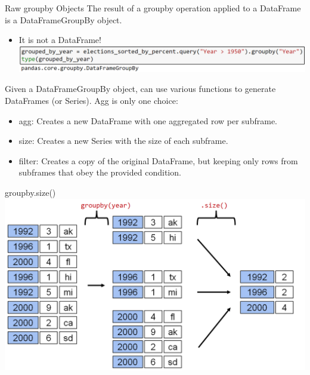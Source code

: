 \documentclass[aspectratio=169]{../latex_main/tntbeamer}  %
\begin{document}
    
    
    \begin{frame}{Raw groupby Objects}
        The result of a groupby operation applied to a DataFrame is a DataFrameGroupBy object.
        \begin{itemize}
            \item It is not a DataFrame!
            \includegraphics[scale=.39]{Bild33}
        \end{itemize}
        Given a DataFrameGroupBy object, can use various functions to generate DataFrames (or Series). Agg is only one choice:
        \begin{itemize}
            \item agg: Creates a new DataFrame with one aggregated row per subframe.
            \item size: Creates a new Series with the size of each subframe.
            \item filter: Creates a copy of the original DataFrame, but keeping only rows from subframes that obey the provided condition.
        \end{itemize}
    \end{frame}
    
    
    
    \begin{frame}{groupby.size()}
        \centering
         \includegraphics[scale=.35]{Bild34}
    \end{frame}
    
\end{document}
